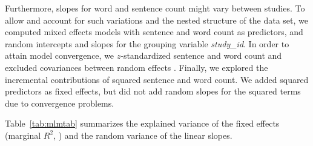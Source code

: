\documentclass[man,a4paper,mask]{apa6}\usepackage[]{graphicx}\usepackage[]{color}
\begin{document}
Furthermore, slopes for word and sentence count might vary between studies. To allow and account for such variations and the nested structure of the data set, we computed mixed effects models with sentence and word count as predictors, and random intercepts and slopes for the grouping variable \emph{study\_id}. In order to attain model convergence, we $z$-standardized sentence and word count and excluded covariances between random effects \parencite{bates_parsimonious_2015}. Finally, we explored the incremental contributions of squared sentence and word count. We added squared predictors as fixed effects, but did not add random slopes for the squared terms due to convergence problems.

Table~\ref{tab:mlmtab} summarizes the explained variance of the fixed effects (marginal $R^2$, ) and the random variance of the linear slopes.
\end{document}
